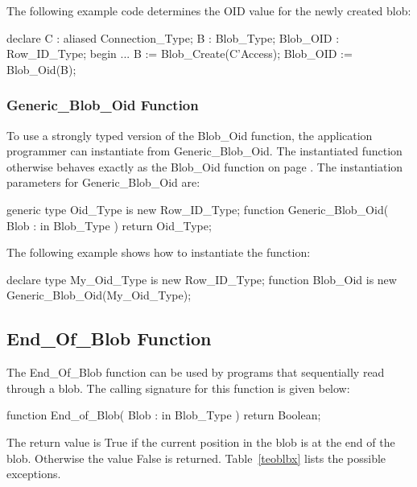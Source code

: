 \documentclass[english,letterpaper]{book}
\begin{document}
The following example code determines the OID value for the newly
created blob:

\begin{Example}
declare
   C :         aliased Connection_Type;
   B :         Blob_Type;
   Blob_OID :  Row_ID_Type;
begin
   ...
   B        := Blob_Create(C'Access);
   Blob_OID := Blob_Oid(B);
\end{Example}

\subsubsection{Generic\_Blob\_Oid Function}

To use a strongly typed version of the Blob\_Oid function, the application
programmer can instantiate from Generic\_Blob\_Oid. The instantiated
function otherwise behaves exactly as the Blob\_Oid function on page
\pageref{Blob OID Function}. The instantiation parameters for Generic\_Blob\_Oid
are:

\begin{Code}
generic
   type Oid_Type is new Row_ID_Type;
function Generic_Blob_Oid(
   Blob : in Blob_Type
) return Oid_Type;
\end{Code}

The following example shows how to instantiate the function:

\begin{Example}
declare
   type My_Oid_Type is new Row_ID_Type;
   function Blob_Oid is new Generic_Blob_Oid(My_Oid_Type);
\end{Example}

\subsection{End\_Of\_Blob Function}

The End\_Of\_Blob function can be used by programs that sequentially
read through a blob. The calling signature for this function is given
below:%

\begin{Code}
function End_of_Blob(
   Blob : in Blob_Type
) return Boolean;
\end{Code}

The return value is True if the current position in the blob is at
the end of the blob. Otherwise the value False is returned. Table~\ref{teoblbx}
lists the possible exceptions.
\end{document}
